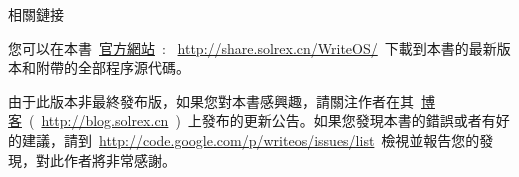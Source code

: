 \vspace{5ex}

\begin{lined}{\textwidth}\vspace{2ex}
\begin{center}
相關鏈接
\end{center}
\vspace{2ex}
\end{lined}

您可以在本書~\href{http://share.solrex.cn/WriteOS/}{官方網站}~: ~\url{http://share.solrex.cn/WriteOS/}~下載到本書的最新版本和附帶的全部程序源代碼。

由于此版本非最終發布版，如果您對本書感興趣，請關注作者在其~\href{http://blog.solrex.cn/articles/category/cs/opensource/writeos}{博客}~(~\url{http://blog.solrex.cn}~)~上發布的更新公告。如果您發現本書的錯誤或者有好的建議，請到~\url{http://code.google.com/p/writeos/issues/list}~檢視並報告您的發現，對此作者將非常感謝。
